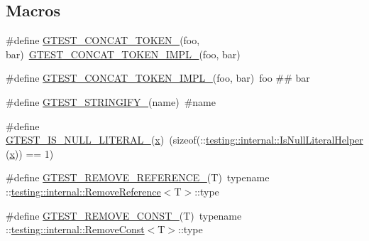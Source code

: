 \subsection*{Macros}
\begin{DoxyCompactItemize}
\item 
\#define \mbox{\hyperlink{_obj__test_2lib_2googletest-release-1_88_81_2googletest_2include_2gtest_2internal_2gtest-internal_8h_ae3c336cbe1ae2bd1b1d019333e4428a0}{G\+T\+E\+S\+T\+\_\+\+C\+O\+N\+C\+A\+T\+\_\+\+T\+O\+K\+E\+N\+\_\+}}(foo,  bar)~\mbox{\hyperlink{_obj__test_2lib_2googletest-release-1_88_81_2googletest_2include_2gtest_2internal_2gtest-internal_8h_aa39fb5346d3573feebe4257cb3a01fde}{G\+T\+E\+S\+T\+\_\+\+C\+O\+N\+C\+A\+T\+\_\+\+T\+O\+K\+E\+N\+\_\+\+I\+M\+P\+L\+\_\+}}(foo, bar)
\item 
\#define \mbox{\hyperlink{_obj__test_2lib_2googletest-release-1_88_81_2googletest_2include_2gtest_2internal_2gtest-internal_8h_aa39fb5346d3573feebe4257cb3a01fde}{G\+T\+E\+S\+T\+\_\+\+C\+O\+N\+C\+A\+T\+\_\+\+T\+O\+K\+E\+N\+\_\+\+I\+M\+P\+L\+\_\+}}(foo,  bar)~foo \#\# bar
\item 
\#define \mbox{\hyperlink{_obj__test_2lib_2googletest-release-1_88_81_2googletest_2include_2gtest_2internal_2gtest-internal_8h_affa935d4361fa573644e9c739dde2b14}{G\+T\+E\+S\+T\+\_\+\+S\+T\+R\+I\+N\+G\+I\+F\+Y\+\_\+}}(name)~\#name
\item 
\#define \mbox{\hyperlink{_obj__test_2lib_2googletest-release-1_88_81_2googletest_2include_2gtest_2internal_2gtest-internal_8h_ae5dd8e23090e08856613878fa1ff6fca}{G\+T\+E\+S\+T\+\_\+\+I\+S\+\_\+\+N\+U\+L\+L\+\_\+\+L\+I\+T\+E\+R\+A\+L\+\_\+}}(\mbox{\hyperlink{_obj__test_2lib_2googletest-master_2googlemock_2test_2gmock-matchers__test_8cc_a6150e0515f7202e2fb518f7206ed97dc}{x}})~(sizeof(\+::\mbox{\hyperlink{namespacetesting_1_1internal_afb0731ba39ffef1fa1730ac0699c9025}{testing\+::internal\+::\+Is\+Null\+Literal\+Helper}}(\mbox{\hyperlink{_obj__test_2lib_2googletest-master_2googlemock_2test_2gmock-matchers__test_8cc_a6150e0515f7202e2fb518f7206ed97dc}{x}})) == 1)
\item 
\#define \mbox{\hyperlink{_obj__test_2lib_2googletest-release-1_88_81_2googletest_2include_2gtest_2internal_2gtest-internal_8h_a84c72f25a6a6600e3ff8381ca6982ae9}{G\+T\+E\+S\+T\+\_\+\+R\+E\+M\+O\+V\+E\+\_\+\+R\+E\+F\+E\+R\+E\+N\+C\+E\+\_\+}}(T)~typename \+::\mbox{\hyperlink{structtesting_1_1internal_1_1_remove_reference}{testing\+::internal\+::\+Remove\+Reference}}$<$T$>$\+::type
\item 
\#define \mbox{\hyperlink{_obj__test_2lib_2googletest-release-1_88_81_2googletest_2include_2gtest_2internal_2gtest-internal_8h_a2ffec8c60510eb130af387f5ce9a756a}{G\+T\+E\+S\+T\+\_\+\+R\+E\+M\+O\+V\+E\+\_\+\+C\+O\+N\+S\+T\+\_\+}}(T)~typename \+::\mbox{\hyperlink{structtesting_1_1internal_1_1_remove_const}{testing\+::internal\+::\+Remove\+Const}}$<$T$>$\+::type

\end{DoxyCompactItemize}
